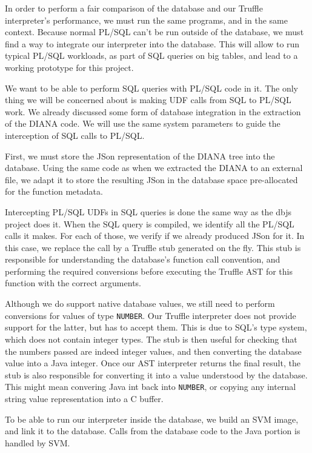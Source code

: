\documentclass[twoside,11pt,a4paper]{article}
\newcommand{\java}[1]{\textsf{#1}}
\newcommand{\pls}[1]{\texttt{#1}}
\newcommand{\plstype}[1]{\pls{#1}}
\newcommand{\oranum}{\plstype{NUMBER}}
\begin{document}
In order to perform a fair comparison of the database and our Truffle interpreter's performance, we must run the same programs, and in the same context. Because normal PL/SQL can't be run outside of the database, we must find a way to integrate our interpreter into the database. This will allow to run typical PL/SQL workloads, as part of SQL queries on big tables, and lead to a working prototype for this project.

We want to be able to perform SQL queries with PL/SQL code in it. The only thing we will be concerned about is making UDF calls from SQL to PL/SQL work. We already discussed some form of database integration in the extraction of the DIANA code. We will use the same system parameters to guide the interception of SQL calls to PL/SQL.

First, we must store the JSon representation of the DIANA tree into the database. Using the same code as when we extracted the DIANA to an external file, we adapt it to store the resulting JSon in the database space pre-allocated for the function metadata.

Intercepting PL/SQL UDFs in SQL queries is done the same way as the dbjs project does it. When the SQL query is compiled, we identify all the PL/SQL calls it makes. For each of those, we verify if we already produced JSon for it. In this case, we replace the call by a Truffle stub generated on the fly. This stub is responsible for understanding the database's function call convention, and performing the required conversions before executing the Truffle AST for this function with the correct arguments.

Although we do support native database values, we still need to perform conversions for values of type \oranum{}. Our Truffle interpreter does not provide support for the latter, but has to accept them. This is due to SQL's type system, which does not contain integer types. The stub is then useful for checking that the numbers passed are indeed integer values, and then converting the database value into a Java integer. Once our AST interpreter returns the final result, the stub is also responsible for converting it into a value understood by the database. This might mean convering Java \java{int} back into \oranum{}, or copying any internal string value representation into a C buffer.

To be able to run our interpreter inside the database, we build an SVM image, and link it to the database. Calls from the database code to the Java portion is handled by SVM.
\end{document}
